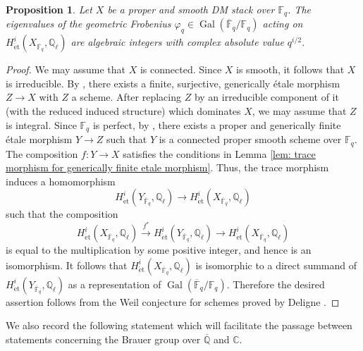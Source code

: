 \documentclass{amsart}
\newtheorem{prop}{Proposition}[section]
\theoremstyle{definition}
\theoremstyle{remark}
\DeclareMathOperator{\Gal}{Gal}
\newcommand{\Q}{\mathbb{Q}}
\newcommand{\QQ}{\mathbb Q}
\newcommand{\et}{\operatorname{\acute{e}t}}%
\begin{document}
\begin{prop}\label{prop: Riemann Hypothesis Weil DM stacks}
    Let
    $X$ be a proper and smooth DM stack over $\mathbb{F}_{q}$.
    The eigenvalues of the geometric Frobenius $\varphi_{q}\in \Gal(\overline{\mathbb{F}}_{q}/\mathbb{F}_{q})$ acting on
    $H^{i}_{\et}(X_{\overline{\mathbb{F}}_{q}},\mathbb{Q}_{\ell})$
    are algebraic integers with complex absolute value $q^{i/2}$.
\end{prop}
\begin{proof}
    We may assume that $X$ is connected.
    Since $X$ is smooth, it follows that $X$ is irreducible.
    By \cite[Th\'eor\`eme 16.6]{Laumon-Moret-Bailly}, there exists a finite, surjective, generically \'etale morphism
    $Z \to X$ with $Z$ a scheme.
    After replacing $Z$ by an irreducible component of it (with the reduced induced structure) which dominates $X$, we may assume that $Z$ is integral.
    Since $\mathbb{F}_{q}$ is perfect,
    by \cite[Theorem 4.1]{deJongAlteration}, there exists a proper and generically finite \'etale morphism
    $Y \to Z$
    such that $Y$ is a connected proper smooth scheme over $\mathbb{F}_{q}$.
    The composition 
    $f \colon Y \to X$ satisfies the conditions in Lemma \ref{lem: trace morphism for generically finite etale morphism}.
    Thus, the trace morphism induces a homomorphism
    \[
    H^i_{\et}(Y_{\overline{\mathbb{F}}_{q}}, \QQ_\ell) \to H^i_{\et}(X_{\overline{\mathbb{F}}_{q}}, \QQ_\ell)
    \]
    such that the composition
    \[
    H^i_{\et}(X_{\overline{\mathbb{F}}_{q}}, \QQ_\ell) \overset{f^*}{\to} H^i_{\et}(Y_{\overline{\mathbb{F}}_{q}}, \QQ_\ell) \to H^i_{\et}(X_{\overline{\mathbb{F}}_{q}}, \QQ_\ell)
    \]
    is equal to the multiplication by some positive integer, and hence is an isomorphism.
    It follows that
    $H^i_{\et}(X_{\overline{\mathbb{F}}_{q}}, \QQ_\ell)$
    is isomorphic to a direct summand of
    $H^i_{\et}(Y_{\overline{\mathbb{F}}_{q}}, \QQ_\ell)$
    as a representation of $\Gal(\overline{\mathbb{F}}_{q}/\mathbb{F}_{q})$.
    Therefore the desired assertion follows from the Weil conjecture for schemes proved by Deligne \cite{WeilI, WeilII}.
\end{proof}

We also record the following statement which will facilitate the passage between statements concerning the Brauer group over $\overline{\Q}$ and $\mathbb{C}.$
\end{document}
